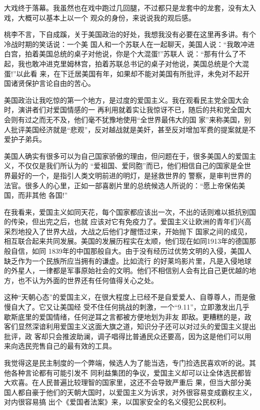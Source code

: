 ﻿\documentclass[11pt]{article}
\begin{document}
大戏终于落幕。我虽然也在戏中跑过几回腿，不过都只是龙套中的龙套，没有太入戏，大概可以基本上以一个
观众的身份，来说说我的观后感。

桃李不言，下自成蹊，关于美国政治的好处，我想我没有必要在这里再多讲。有个冷战时期的笑话说：一个美
国人和一个苏联人在一起聊天，美国人说：``我敢冲进白宫，拍着美国总统的桌子对他说，你是个大混蛋!''苏联人
说：``那有什么了不起，我也敢冲进克里姆林宫，拍着苏联总书记的桌子对他说，美国总统是个大混蛋!''以此看
来，在下迁居美国有年，如果却不能对美国有所批评，未免对不起开国诸贤保护言论自由的苦心。

美国政治让我吃惊的第一个地方，是过度的爱国主义。我在观看民主党全国大会时，演讲者们对爱国情感的一
再利用就着实让我惊讶不已，随后的共和党全国大会则有过之而无不及，他们毫不犹豫地使用``全世界最伟大的国
家''来称美国，别人批评美国经济就是``悲观''，反对越战就是美奸，甚至反对增加军费的提案就是不爱护子弟兵。

美国人确实有很多可以为自己国家骄傲的理由，但问题在于，很多美国人的爱国主义，不仅仅是我们所认为的
``爱祖国、爱同胞''而已，他们相信自己的国家是全世界最好的一个，是指引人类文明前进的明灯，是拯救世界的
警察，是审判世界的法官。很多人的心里，正如一部喜剧片里的总统候选人所说的：``愿上帝保佑美国，而非其他
各国!''

在我看来，爱国主义如同天花，每个国家都应该出一次，不出的话则难以抵抗别国的传染，但出完之后，也就
应该对它有免疫力了。爱国主义让欧洲的青年们兴高采烈地投入了世界大战，大战之后他们才醒悟过来，开始抛下
国家之间的成见，相互联合起来共同发展。美国的发展历程实在太顺，他们现在如同1913年的德国那般自信，如同
1839年的中国那般自大。由于没有经历过优势文明的入侵，美国人缺乏作为一个民族所应当拥有的谦虚。比如流行
的好莱坞影片里，凡是入侵地球的外星人，一律都是军事原始社会的文明。他们不相信别人会有比自己更优越的地
方，也不认为外面的世界还有任何值得关心之处。

这种``天朝心态''的爱国主义，在很大程度上已经不是自爱爱人、自尊尊人，而是傲慢自大了。它又让美国经
受不住任何挑战的刺激，一个``9.11''，立即激发出几乎歇斯底里的爱国情绪，任何逆耳之言都被方便地划为非友
即敌。更糟糕的是，政客们显然深谙利用爱国主义这面大旗之道，知识分子还可以对过头的爱国主义提出批评，政
客却只会推波助澜，调子唱得比普通民众还要高，因为这是他们可以用来向选民兜售自己的最有效的工具。

我觉得这是民主制度的一个弊端，候选人为了能当选，专门捡选民喜欢听的说。其他各种言论都有可能引发不
同利益集团的争议，爱国主义却可以让全体选民都皆大欢喜。在人民普遍比较理智的国家里，这还不会导致严重后
果，但当大部分美国人都自豪于他们的天朝大国时，以爱国主义为诉求，对外很容易变成霸权主义，对内很容易搞
出个《爱国者法案》来，以国家安全的名义侵犯公民权利。
\end{document}
